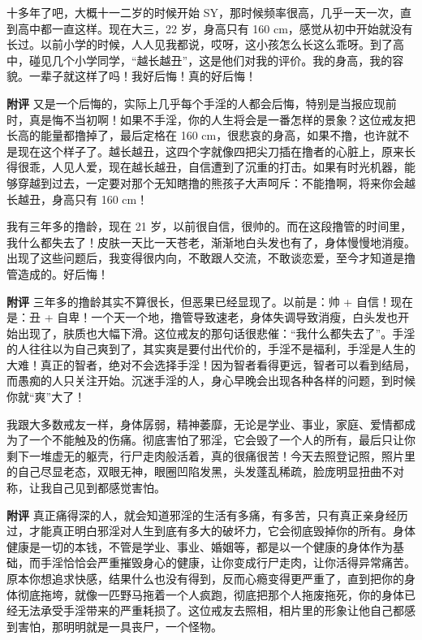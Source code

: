 \begin{case}[变丑]
    十多年了吧，大概十一二岁的时候开始 SY，那时候频率很高，几乎一天一次，直到高中都一直这样。现在大三，22 岁，身高只有 160 \unit{\cm}，感觉从初中开始就没有长过。以前小学的时候，人人见我都说，哎呀，这小孩怎么长这么乖呀。到了高中，碰见几个小学同学，“越长越丑”，这是他们对我的评价。我的身高，我的容貌。一辈子就这样了吗！我好后悔！真的好后悔！

    \textbf{附评} 又是一个后悔的，实际上几乎每个手淫的人都会后悔，特别是当报应现前时，真是悔不当初啊！如果不手淫，你的人生将会是一番怎样的景象？这位戒友把长高的能量都撸掉了，最后定格在 160 \unit{\cm}，很悲哀的身高，如果不撸，也许就不是现在这个样子了。越长越丑，这四个字就像四把尖刀插在撸者的心脏上，原来长得很乖，人见人爱，现在越长越丑，自信遭到了沉重的打击。如果有时光机器，能够穿越到过去，一定要对那个无知瞎撸的熊孩子大声呵斥：不能撸啊，将来你会越长越丑，身高只有 160 \unit{\cm}！
\end{case}

\begin{case}[变丑]
    我有三年多的撸龄，现在 21 岁，以前很自信，很帅的。而在这段撸管的时间里，我什么都失去了！皮肤一天比一天苍老，渐渐地白头发也有了，身体慢慢地消瘦。出现了这些问题后，我变得很内向，不敢跟人交流，不敢谈恋爱，至今才知道是撸管造成的。好后悔！

    \textbf{附评} 三年多的撸龄其实不算很长，但恶果已经显现了。以前是：帅 + 自信！现在是：丑 + 自卑！一个天一个地，撸管导致速老，身体失调导致消瘦，白头发也开始出现了，肤质也大幅下滑。这位戒友的那句话很悲催：“我什么都失去了”。手淫的人往往以为自己爽到了，其实爽是要付出代价的，手淫不是福利，手淫是人生的大难！真正的智者，绝对不会选择手淫！因为智者看得更远，智者可以看到结局，而愚痴的人只关注开始。沉迷手淫的人，身心早晚会出现各种各样的问题，到时候你就“爽”大了！
\end{case}

\begin{case}[变丑]
    我跟大多数戒友一样，身体孱弱，精神萎靡，无论是学业、事业，家庭、爱情都成为了一个不能触及的伤痛。彻底害怕了邪淫，它会毁了一个人的所有，最后只让你剩下一堆虚无的躯壳，行尸走肉般活着，真的很痛很苦！今天去照登记照，照片里的自己尽显老态，双眼无神，眼圈凹陷发黑，头发蓬乱稀疏，脸庞明显扭曲不对称，让我自己见到都感觉害怕。

    \textbf{附评} 真正痛得深的人，就会知道邪淫的生活有多痛，有多苦，只有真正亲身经历过，才能真正明白邪淫对人生到底有多大的破坏力，它会彻底毁掉你的所有。身体健康是一切的本钱，不管是学业、事业、婚姻等，都是以一个健康的身体作为基础，而手淫恰恰会严重摧毁身心的健康，让你变成行尸走肉，让你活得异常痛苦。原本你想追求快感，结果什么也没有得到，反而心瘾变得更严重了，直到把你的身体彻底拖垮，就像一匹野马拖着一个人疯跑，彻底把那个人拖废拖死，你的身体已经无法承受手淫带来的严重耗损了。这位戒友去照相，相片里的形象让他自己都感到害怕，那明明就是一具丧尸，一个怪物。
\end{case}

